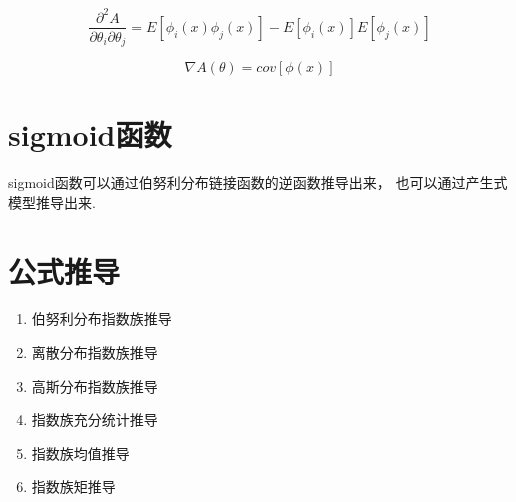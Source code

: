 \begin{equation}
\frac{\partial^2A}{\partial\theta_i\partial\theta_j}=
E[\phi_i(x)\phi_j(x)] - E[\phi_i(x)]E[\phi_j(x)]
\end{equation}

\begin{equation}
\nabla A(\theta) = cov[\phi(x)]
\end{equation}

\section{sigmoid函数}
sigmoid函数可以通过伯努利分布链接函数的逆函数推导出来，
也可以通过产生式模型推导出来.

\section{公式推导}
\begin{enumerate}
\item 伯努利分布指数族推导
\item 离散分布指数族推导
\item 高斯分布指数族推导
\item 指数族充分统计推导
\item 指数族均值推导
\item 指数族矩推导
\end{enumerate}

